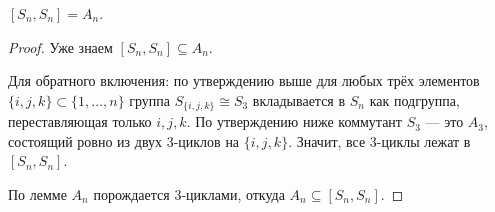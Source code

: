 \begin{theorem}
    $[S_n, S_n] = A_n$.
    \begin{proof}
        Уже знаем $[S_n, S_n] \subseteq A_n$.
 
        Для обратного включения: по утверждению выше для любых трёх элементов $\{i,j,k\} \subset \{1,\ldots,n\}$ группа $S_{\{i,j,k\}} \cong S_3$ вкладывается в $S_n$ как подгруппа, переставляющая только $i,j,k$. По утверждению ниже коммутант $S_3$ --- это $A_3$, состоящий ровно из двух 3-циклов на $\{i,j,k\}$. Значит, все 3-циклы лежат в $[S_n, S_n]$.
 
        По лемме $A_n$ порождается 3-циклами, откуда $A_n \subseteq [S_n, S_n]$.
    \end{proof}
\end{theorem}
 
